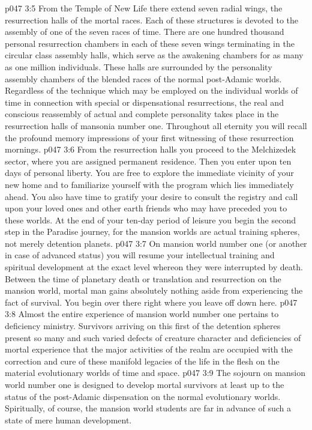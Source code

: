 \vs p047 3:5 From the Temple of New Life there extend seven radial wings, the resurrection halls of the mortal races. Each of these structures is devoted to the assembly of one of the seven races of time. There are one hundred thousand personal resurrection chambers in each of these seven wings terminating in the circular class assembly halls, which serve as the awakening chambers for as many as one million individuals. These halls are surrounded by the personality assembly chambers of the blended races of the normal post\hyp{}Adamic worlds. Regardless of the technique which may be employed on the individual worlds of time in connection with special or dispensational resurrections, the real and conscious reassembly of actual and complete personality takes place in the resurrection halls of mansonia number one. Throughout all eternity you will recall the profound memory impressions of your first witnessing of these resurrection mornings.
\pc \vs p047 3:6 From the resurrection halls you proceed to the Melchizedek sector, where you are assigned permanent residence. Then you enter upon ten days of personal liberty. You are free to explore the immediate vicinity of your new home and to familiarize yourself with the program which lies immediately ahead. You also have time to gratify your desire to consult the registry and call upon your loved ones and other earth friends who may have preceded you to these worlds. At the end of your ten\hyp{}day period of leisure you begin the second step in the Paradise journey, for the mansion worlds are actual training spheres, not merely detention planets.
\pc \vs p047 3:7 On mansion world number one (or another in case of advanced status) you will resume your intellectual training and spiritual development at the exact level whereon they were interrupted by death. Between the time of planetary death or translation and resurrection on the mansion world, mortal man gains absolutely nothing aside from experiencing the fact of survival. You begin over there right where you leave off down here.
\vs p047 3:8 Almost the entire experience of mansion world number one pertains to deficiency ministry. Survivors arriving on this first of the detention spheres present so many and such varied defects of creature character and deficiencies of mortal experience that the major activities of the realm are occupied with the correction and cure of these manifold legacies of the life in the flesh on the material evolutionary worlds of time and space.
\vs p047 3:9 The sojourn on mansion world number one is designed to develop mortal survivors at least up to the status of the post\hyp{}Adamic dispensation on the normal evolutionary worlds. Spiritually, of course, the mansion world students are far in advance of such a state of mere human development.
